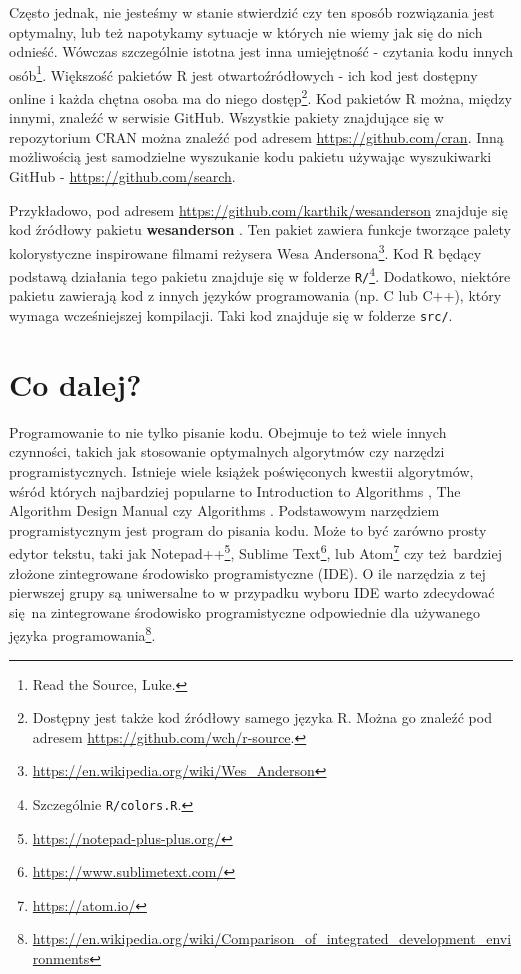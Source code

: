 \documentclass[paper=6in:9in,pagesize=pdftex,headinclude=on,footinclude=on,10pt]{scrbook}
\DeclareRobustCommand{\href}[2]{#2\footnote{\url{#1}}}
\begin{document}
Często jednak, nie jesteśmy w stanie stwierdzić czy ten sposób rozwiązania jest optymalny, lub też napotykamy sytuacje w których nie wiemy jak się do nich odnieść.
Wówczas szczególnie istotna jest inna umiejętność - czytania kodu innych osób\footnote{Read the Source, Luke.}.
Większość pakietów R jest otwartoźródłowych - ich kod jest dostępny online i każda chętna osoba ma do niego dostęp\footnote{Dostępny jest także kod źródłowy samego języka R.
  Można go znaleźć pod adresem \url{https://github.com/wch/r-source}.}.
Kod pakietów R można, między innymi, znaleźć w serwisie GitHub.
Wszystkie pakiety znajdujące się w repozytorium CRAN można znaleźć pod adresem \url{https://github.com/cran}.
Inną możliwością jest samodzielne wyszukanie kodu pakietu używając wyszukiwarki GitHub - \url{https://github.com/search}.

Przykładowo, pod adresem \url{https://github.com/karthik/wesanderson} znajduje się kod źródłowy pakietu \textbf{wesanderson} \citep{R-wesanderson}.
Ten pakiet zawiera funkcje tworzące palety kolorystyczne inspirowane filmami reżysera \href{https://en.wikipedia.org/wiki/Wes_Anderson}{Wesa Andersona}.
Kod R będący podstawą działania tego pakietu znajduje się w folderze \texttt{R/}\footnote{Szczególnie \texttt{R/colors.R}.}.
Dodatkowo, niektóre pakietu zawierają kod z innych języków programowania (np. C lub C++), który wymaga wcześniejszej kompilacji.
Taki kod znajduje się w folderze \texttt{src/}.

\hypertarget{co-dalej}{%
\section{Co dalej?}\label{co-dalej}}

Programowanie to nie tylko pisanie kodu.
Obejmuje to też wiele innych czynności, takich jak stosowanie optymalnych algorytmów czy narzędzi programistycznych.
Istnieje wiele książek poświęconych kwestii algorytmów, wśród których najbardziej popularne to Introduction to Algorithms \citep{cormen2009introduction}, The Algorithm Design Manual \citep{skienaAlgorithmDesignManual2008} czy Algorithms \citep{032157351X}.
Podstawowym narzędziem programistycznym jest program do pisania kodu.
Może to być zarówno prosty edytor tekstu, taki jak \href{https://notepad-plus-plus.org/}{Notepad++}, \href{https://www.sublimetext.com/}{Sublime Text}, lub \href{https://atom.io/}{Atom} czy też~bardziej złożone zintegrowane środowisko programistyczne (IDE).
O ile narzędzia z tej pierwszej grupy są uniwersalne to w przypadku wyboru IDE warto zdecydować się~na zintegrowane środowisko programistyczne odpowiednie dla używanego języka programowania\footnote{\url{https://en.wikipedia.org/wiki/Comparison_of_integrated_development_environments}}.
\end{document}
